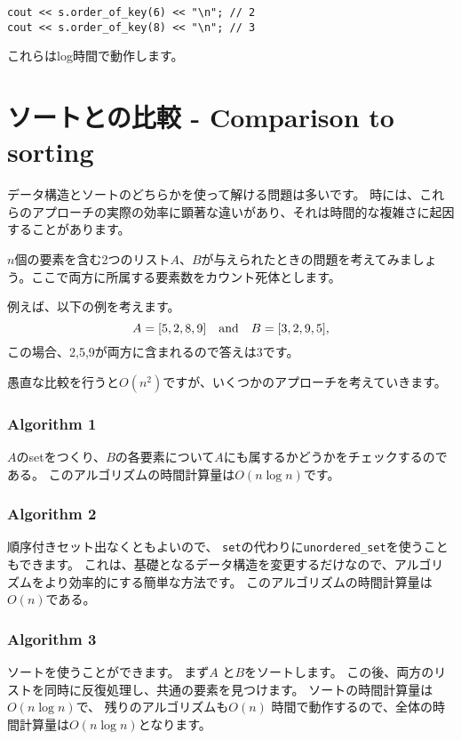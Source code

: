 \begin{lstlisting}
cout << s.order_of_key(6) << "\n"; // 2
cout << s.order_of_key(8) << "\n"; // 3
\end{lstlisting}

これらはlog時間で動作します。

\section{ソートとの比較 - Comparison to sorting}

データ構造とソートのどちらかを使って解ける問題は多いです。
時には、これらのアプローチの実際の効率に顕著な違いがあり、それは時間的な複雑さに起因することがあります。

$n$個の要素を含む2つのリスト$A$、$B$が与えられたときの問題を考えてみましょう。ここで両方に所属する要素数をカウント死体とします。

例えば、以下の例を考えます。
\[A = [5,2,8,9] \hspace{10px} \textrm{and} \hspace{10px} B = [3,2,9,5],\]
この場合、2,5,9が両方に含まれるので答えは3です。

愚直な比較を行うと$O(n^2)$ですが、いくつかのアプローチを考えていきます。

\subsubsection{Algorithm 1}

$A$のsetをつくり、$B$の各要素について$A$にも属するかどうかをチェックするのである。
このアルゴリズムの時間計算量は$O(n \log n)$です。

\subsubsection{Algorithm 2}

順序付きセット出なくともよいので、
\texttt{set}の代わりに\texttt{unordered\_set}を使うこともできます。
これは、基礎となるデータ構造を変更するだけなので、アルゴリズムをより効率的にする簡単な方法です。
このアルゴリズムの時間計算量は$O(n)$である。

\subsubsection{Algorithm 3}

ソートを使うことができます。
まず$A$ と$B$をソートします。
この後、両方のリストを同時に反復処理し、共通の要素を見つけます。
ソートの時間計算量は$O(n \log n)$で、
残りのアルゴリズムも$O(n)$ 時間で動作するので、全体の時間計算量は$O(n \log n)$となります。

